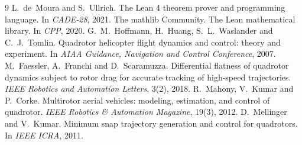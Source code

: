 \documentclass[11pt]{article}
\begin{document}
\begin{thebibliography}{9}\small
{} L.~de~Moura and S.~Ullrich. The Lean 4 theorem prover and programming language. In
\emph{CADE-28}, 2021.
 The mathlib Community. The Lean mathematical library. In \emph{CPP}, 2020.
 G.~M.~Hoffmann, H.~Huang, S.~L.~Waslander and C.~J.~Tomlin. Quadrotor helicopter
flight dynamics and control: theory and experiment. In \emph{AIAA Guidance, Navigation and Control
Conference}, 2007.
 M.~Faessler, A.~Franchi and D.~Scaramuzza. Differential flatness of quadrotor
dynamics subject to rotor drag for accurate tracking of high-speed trajectories. \emph{IEEE Robotics and
Automation Letters}, 3(2), 2018.
 R.~Mahony, V.~Kumar and P.~Corke. Multirotor aerial vehicles: modeling, estimation,
and control of quadrotor. \emph{IEEE Robotics \& Automation Magazine}, 19(3), 2012.
 D.~Mellinger and V.~Kumar. Minimum snap trajectory generation and control for
quadrotors. In \emph{IEEE ICRA}, 2011.
\end{thebibliography}
\end{document}
